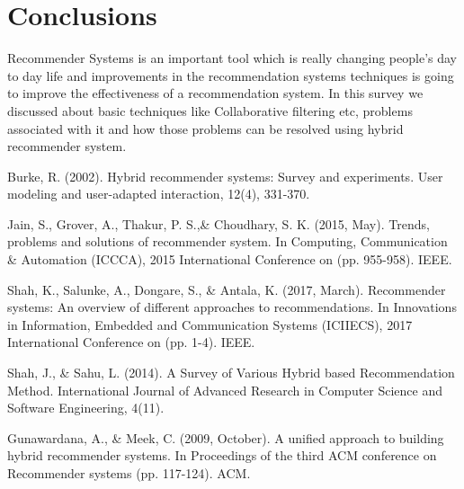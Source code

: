 \documentclass[conference]{IEEEtran}
\begin{document}
\section{Conclusions}
	Recommender Systems is an important tool which is really changing people's day to day life and improvements in the recommendation systems techniques is going to improve the effectiveness of a recommendation system. In this survey we discussed about basic techniques like Collaborative filtering etc, problems associated with it and how those problems can be resolved using hybrid recommender system.



\begin{thebibliography}{9}

Burke, R. (2002). Hybrid recommender systems: Survey and experiments. User modeling and user-adapted interaction, 12(4), 331-370.

Jain, S., Grover, A., Thakur, P. S.,\& Choudhary, S. K. (2015, May). Trends, problems and solutions of recommender system. In Computing, Communication \& Automation (ICCCA), 2015 International Conference on (pp. 955-958). IEEE.

Shah, K., Salunke, A., Dongare, S., \& Antala, K. (2017, March). Recommender systems: An overview of different approaches to recommendations. In Innovations in Information, Embedded and Communication Systems (ICIIECS), 2017 International Conference on (pp. 1-4). IEEE.

Shah, J., \& Sahu, L. (2014). A Survey of Various Hybrid based Recommendation Method. International Journal of Advanced Research in Computer Science and Software Engineering, 4(11).

Gunawardana, A., \& Meek, C. (2009, October). A unified approach to building hybrid recommender systems. In Proceedings of the third ACM conference on Recommender systems (pp. 117-124). ACM.

\end{thebibliography}
\end{document}
